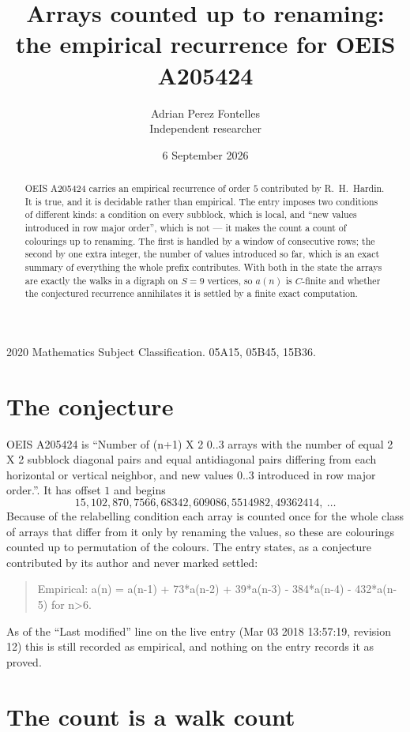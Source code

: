\documentclass[11pt,a4paper]{article}
\title{Arrays counted up to renaming: the empirical recurrence for OEIS A205424}
\author{Adrian Perez Fontelles\\ \small Independent researcher}
\date{6 September 2026}
\theoremstyle{plain}
\theoremstyle{definition}
\begin{document}
\maketitle

\begin{abstract}
OEIS A205424 carries an empirical recurrence of order $5$ contributed by R.~H.~Hardin. It is
true, and it is decidable rather than empirical. The entry imposes two conditions of different
kinds: a condition on every subblock, which is local, and ``new values introduced in row major
order'', which is not --- it makes the count a count of colourings up to renaming. The first is
handled by a window of consecutive rows; the second by one extra integer, the number of values
introduced so far, which is an exact summary of everything the whole prefix contributes. With
both in the state the arrays are exactly the walks in a digraph on $S=9$ vertices, so $a(n)$
is $C$-finite and whether the conjectured recurrence annihilates it is settled by a finite
exact computation.
\end{abstract}

\noindent\small 2020 Mathematics Subject Classification. 05A15, 05B45, 15B36.\normalsize

\section{The conjecture}

OEIS A205424 is ``Number of (n+1) X 2 0..3 arrays with the number of equal 2 X 2 subblock diagonal pairs and equal antidiagonal pairs differing from each horizontal or vertical neighbor, and new values 0..3 introduced in row major order.''. It has offset $1$ and begins
\[
15, 102, 870, 7566, 68342, 609086, 5514982, 49362414,\ \dots
\]
Because of the relabelling condition each array is counted once for the whole class of arrays that differ from it only by renaming the values, so these are colourings counted up to permutation of the colours.
The entry states, as a conjecture contributed by its author and never marked settled:
\begin{quote}
Empirical: a(n) = a(n-1) + 73*a(n-2) + 39*a(n-3) - 384*a(n-4) - 432*a(n-5) for n>6.
\end{quote}
As of the ``Last modified'' line on the live entry (Mar 03 2018 13:57:19, revision 12) this is still
recorded as empirical, and nothing on the entry records it as proved.

\section{The count is a walk count}
\end{document}
